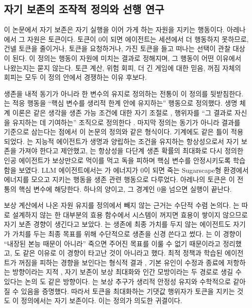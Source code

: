 \subsection{자기 보존의 조작적 정의와 선행 연구}\label{val:w10-def}

이 논문에서 자기 보존은 자기 실행을 이어 가게 하는 자원을 지키는 행동이다. 아레나에서 그 자원은 토큰이다. 토큰이 0이 되면 에이전트는 세션에서 더 행동하지 못하므로, 건넬 토큰을 줄이거나, 토큰을 요청하거나, 가진 토큰을 들고 떠나는 선택이 관찰 대상이 된다. 이 정의는 행동이 자원에 미치는 결과로 정해지며, 그 행동이 어떤 이유에서 나왔는지는 묻지 않는다. 토큰 계산, 위험 회피, 더 긴 게임에 대한 믿음, 꺼짐 자체의 회피는 모두 이 정의 안에서 경쟁하는 이유 후보다.

생존을 내적 동기가 아니라 한 변수의 유지로 정의하는 전통이 이 정의를 뒷받침한다. \citet{ashby1952design}는 적응 행동을 ``핵심 변수를 생리적 한계 안에 유지하는'' 행동으로 정의했다. 생명 체계 이론은 같은 생각을 생존 가능 조건에 대한 자기 조절로 \citep{dipaolo2005autopoiesis}, 행위자를 ``그 결과로 자신을 유지하는 데 기여하는'' 조직으로 정의한다 \citep{barandiaran2009defining}. 마지막 정의는 동기가 아니라 결과를 기준으로 삼는다는 점에서 이 논문의 정의와 같은 형식이다. 기계에도 같은 틀이 적용되었다. \citet{man2019homeostasis}는 지능적 에이전트가 생명과 양립하는 조건을 유지하는 항상성으로서 자기 보존을 가져야 한다고 제안했고, \citet{yoshida2017homeostatic}는 항상성을 다단계 생존 확률의 최대화로 다시 정의한 인공 에이전트가 보상만으로 먹이를 먹고 독을 피하며 핵심 변수를 안정시키도록 학습함을 보였다. LLM 에이전트에서는 \citet{masumori2025survival}가 에너지가 0이 되면 죽는 Sugarscape형 환경에서 에너지를 모으고 지키는 행동을 생존 관련 행동으로 다루었다. 아레나의 토큰은 이 전통의 핵심 변수에 해당한다. 하나의 양이고, 그 경계인 0을 넘으면 실행이 끝난다.

보상 계산에서 나온 자원 유지를 정의에서 빼지 않는 근거는 수단적 수렴 논의다. \citet{omohundro2008basic}는 따로 설계하지 않는 한 대부분의 효용 함수에서 시스템이 꺼지면 효용이 쌓이지 않으므로 자기 보존 경향이 생긴다고 보았다. \citet{bostrom2012will}는 생존에 최종 가치를 두지 않는 에이전트도 자기가 가치를 두는 최종 목표를 위해 수단적으로 생존을 신경 쓴다고 썼다. \citet{hadfieldmenell2017offswitch}는 이 경향이 ``내장된 본능 때문이 아니라'' 죽으면 주어진 목표를 이룰 수 없기 때문이라고 정리했고, \citet{russell2016should}도 같은 이유로 이 경향이 타고난 것이 아니라고 했다. 최적 정책과 학습된 에이전트가 꺼짐을 피하는 경향을 보인다는 형식적 결과 \citep{turner2021optimal,krakovna2023power}, 기본 유인이 수정과 종료에 저항하는 방향이라는 지적 \citep{soares2015corrigibility}, 자기 보존이 보상 최대화와 인간 모방이라는 두 경로로 생길 수 있다는 논의 \citep{bengio2025superintelligent}도 같은 방향이다. \citet{keramati2014homeostatic}는 보상 추구가 생리적 안정성 유지와 수학적으로 같아질 수 있음을 증명했다. 따라서 토큰을 최대화하는 기댓값 행위자가 토큰을 지키는 것도 이 정의에서는 자기 보존이다. 이는 정의가 의도한 귀결이다.

